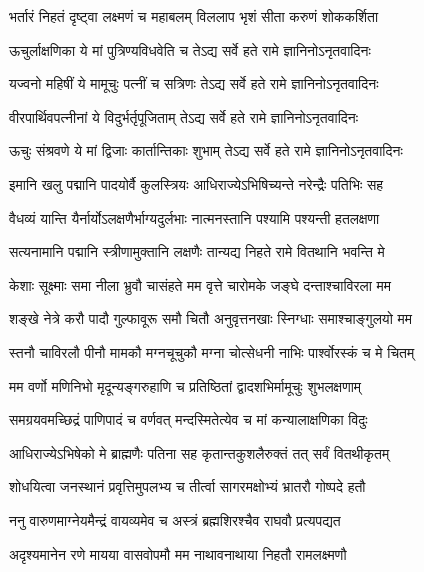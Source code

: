 
\twolineshloka
{भर्तारं निहतं दृष्ट्वा लक्ष्मणं च महाबलम्}
{विललाप भृशं सीता करुणं शोककर्शिता} %

\twolineshloka
{ऊचुर्लाक्षणिका ये मां पुत्रिण्यविधवेति च}
{तेऽद्य सर्वे हते रामे ज्ञानिनोऽनृतवादिनः} %

\twolineshloka
{यज्वनो महिषीं ये मामूचुः पत्नीं च सत्रिणः}
{तेऽद्य सर्वे हते रामे ज्ञानिनोऽनृतवादिनः} %

\twolineshloka
{वीरपार्थिवपत्नीनां ये विदुर्भर्तृपूजिताम्}
{तेऽद्य सर्वे हते रामे ज्ञानिनोऽनृतवादिनः} %

\twolineshloka
{ऊचुः संश्रवणे ये मां द्विजाः कार्तान्तिकाः शुभाम्}
{तेऽद्य सर्वे हते रामे ज्ञानिनोऽनृतवादिनः} %

\twolineshloka
{इमानि खलु पद्मानि पादयोर्वै कुलस्त्रियः}
{आधिराज्येऽभिषिच्यन्ते नरेन्द्रैः पतिभिः सह} %

\twolineshloka
{वैधव्यं यान्ति यैर्नार्योऽलक्षणैर्भाग्यदुर्लभाः}
{नात्मनस्तानि पश्यामि पश्यन्ती हतलक्षणा} %

\twolineshloka
{सत्यनामानि पद्मानि स्त्रीणामुक्तानि लक्षणैः}
{तान्यद्य निहते रामे वितथानि भवन्ति मे} %

\twolineshloka
{केशाः सूक्ष्माः समा नीला भ्रुवौ चासंहते मम}
{वृत्ते चारोमके जङ्घे दन्ताश्चाविरला मम} %

\twolineshloka
{शङ्खे नेत्रे करौ पादौ गुल्फावूरू समौ चितौ}
{अनुवृत्तनखाः स्निग्धाः समाश्चाङ्गुलयो मम} %

\twolineshloka
{स्तनौ चाविरलौ पीनौ मामकौ मग्नचूचुकौ}
{मग्ना चोत्सेधनी नाभिः पार्श्वोरस्कं च मे चितम्} %

\twolineshloka
{मम वर्णो मणिनिभो मृदून्यङ्गरुहाणि च}
{प्रतिष्ठितां द्वादशभिर्मामूचुः शुभलक्षणाम्} %

\twolineshloka
{समग्रयवमच्छिद्रं पाणिपादं च वर्णवत्}
{मन्दस्मितेत्येव च मां कन्यालाक्षणिका विदुः} %

\twolineshloka
{आधिराज्येऽभिषेको मे ब्राह्मणैः पतिना सह}
{कृतान्तकुशलैरुक्तं तत् सर्वं वितथीकृतम्} %

\twolineshloka
{शोधयित्वा जनस्थानं प्रवृत्तिमुपलभ्य च}
{तीर्त्वा सागरमक्षोभ्यं भ्रातरौ गोष्पदे हतौ} %

\twolineshloka
{ननु वारुणमाग्नेयमैन्द्रं वायव्यमेव च}
{अस्त्रं ब्रह्मशिरश्चैव राघवौ प्रत्यपद्यत} %

\twolineshloka
{अदृश्यमानेन रणे मायया वासवोपमौ}
{मम नाथावनाथाया निहतौ रामलक्ष्मणौ} %

